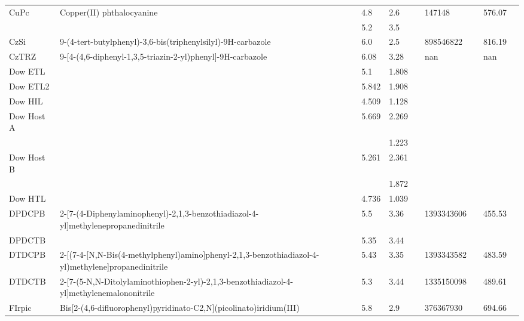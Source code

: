 \documentclass{article}
\begin{document}
\begin{landscape}
\begin{longtable}{| p{} | p{} | p{} | p{} | p{} | p{} | p{} | p{} | p{} | p{} | }
 \hline 
CuPc & Copper(II) phthalocyanine &  & 4.8 & 2.6 &  & 147148 &  & 576.07 &  \\ 
 & &  & 5.2 & 3.5 &  &  & & & \\ 
 
 \hline 
CzSi & 9-(4-tert-butylphenyl)-3,6-bis(triphenylsilyl)-9H-carbazole &  & 6.0 & 2.5 &  & 898546822 &  & 816.19 &  \\ 
 
 \hline 
CzTRZ & 9-[4-(4,6-diphenyl-1,3,5-triazin-2-yl)phenyl]-9H-carbazole &  & 6.08 & 3.28 &  & nan &  & nan &  \\ 
 
 \hline 
Dow ETL &  &  & 5.1 & 1.808 &  &  &  &  &  \\ 
 
 \hline 
Dow ETL2 &  &  & 5.842 & 1.908 &  &  &  &  &  \\ 
 
 \hline 
Dow HIL &  &  & 4.509 & 1.128 &  &  &  &  &  \\ 
 
 \hline 
Dow Host A &  &  & 5.669 & 2.269 &  &  &  &  &  \\ 
 & &  &  & 1.223 &  &  & & & \\ 
 
 \hline 
Dow Host B &  &  & 5.261 & 2.361 &  &  &  &  &  \\ 
 & &  &  & 1.872 &  &  & & & \\ 
 
 \hline 
Dow HTL &  &  & 4.736 & 1.039 &  &  &  &  &  \\ 
 
 \hline 
DPDCPB & 2-[7-(4-Diphenylaminophenyl)-2,1,3-benzothiadiazol-4-yl]methylenepropanedinitrile &  & 5.5 & 3.36 &  & 1393343606 &  & 455.53 &  \\ 
 
 \hline 
DPDCTB &  &  & 5.35 & 3.44 &  &  &  &  &  \\ 
 
 \hline 
DTDCPB & 2-[(7-{4-[N,N-Bis(4-methylphenyl)amino]phenyl}-2,1,3-benzothiadiazol-4-yl)methylene]propanedinitrile &  & 5.43 & 3.35 &  & 1393343582 &  & 483.59 &  \\ 
 
 \hline 
DTDCTB & 2-{[7-(5-N,N-Ditolylaminothiophen-2-yl)-2,1,3-benzothiadiazol-4-yl]methylene}malononitrile &  & 5.3 & 3.44 &  & 1335150098 &  & 489.61 &  \\ 
 
 \hline 
FIrpic & Bis[2-(4,6-difluorophenyl)pyridinato-C2,N](picolinato)iridium(III) &  & 5.8 & 2.9 &  & 376367930 &  & 694.66 &  \\ 
 

\end{longtable}
\end{landscape}
\end{document}
